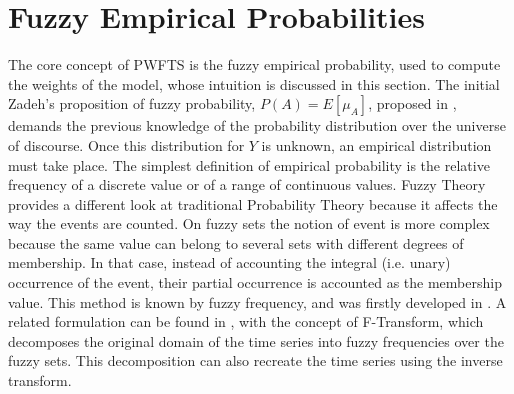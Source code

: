 \section{Fuzzy Empirical Probabilities}
\label{sec:pwfts_empiricalprob}



The core concept of PWFTS is the fuzzy empirical probability, used to compute the weights of the model, whose intuition is discussed in this section. The initial Zadeh's proposition of fuzzy probability, $P(A) = E[\mu_A]$, proposed in \cite{Zadeh1968}, demands the previous knowledge of the probability distribution over the universe of discourse. Once this distribution for $Y$ is unknown, an empirical distribution must take place. The simplest definition of empirical probability is the relative frequency of a discrete value or of a range of continuous values. Fuzzy Theory provides a different look at traditional Probability Theory because it affects the way the events are counted. On fuzzy sets the notion of event is more complex because the same value can belong to several sets with different degrees of membership. In that case, instead of accounting the integral (i.e. unary) occurrence of the event, their partial occurrence is accounted as the membership value. This method is known by fuzzy frequency, and was firstly  developed in \cite{Luo2000}. A related formulation can be found in \cite{Perfilieva2006}, with the concept of F-Transform, which decomposes the original domain of the time series into fuzzy frequencies over the fuzzy sets. This decomposition can also recreate the time series using the inverse transform. 

